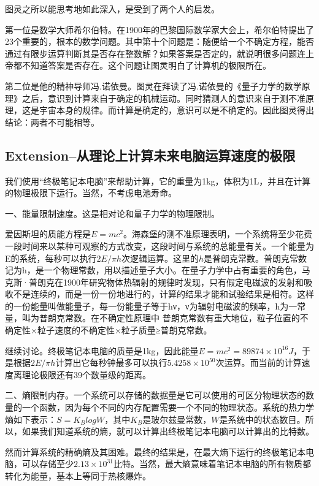 \documentclass{ctexart}
\begin{document}
	图灵之所以能思考地如此深入，是受到了两个人的启发。
	
	第一位是数学大师希尔伯特。在1900年的巴黎国际数学家大会上，希尔伯特提出了23个重要的，根本的数学问题。其中第十个问题是：随便给一个不确定方程，能否通过有限步运算判断其是否存在整数解？如果答案是否定的，就说明很多问题连上帝都不知道答案是否存在。这个问题让图灵明白了计算机的极限所在。
	
	第二位是他的精神导师冯.诺依曼。图灵在拜读了冯.诺依曼的《量子力学的数学原理》之后，意识到计算来自于确定的机械运动。同时猜测人的意识来自于测不准原理，这是宇宙本身的规律。而计算是确定的，意识可以是不确定的。因此图灵得出结论：两者不可能相等。
	\subsection{Extension--从理论上计算未来电脑运算速度的极限}
	我们使用“终极笔记本电脑”来帮助计算，它的重量为1kg，体积为1L，并且在计算的物理极限下运行。当然，不考虑电池寿命。
	
	一、能量限制速度。这是相对论和量子力学的物理限制。
	
	爱因斯坦的质能方程是$ E = mc^2 $。海森堡的测不准原理表明，一个系统将至少花费一段时间来以某种可观察的方式改变，这段时间与系统的总能量有关。一个能量为E的系统，每秒可以执行$ 2E/\pi h $次逻辑运算。这里的$ h $是普朗克常数。普朗克常数记为h，是一个物理常数，用以描述量子大小。在量子力学中占有重要的角色，马克斯·普朗克在1900年研究物体热辐射的规律时发现，只有假定电磁波的发射和吸收不是连续的，而是一份一份地进行的，计算的结果才能和试验结果是相符。这样的一份能量叫做能量子，每一份能量子等于hν，ν为辐射电磁波的频率，h为一常量，叫为普朗克常数。在不确定性原理中 普朗克常数有重大地位，粒子位置的不确定性×粒子速度的不确定性×粒子质量≥普朗克常数。
	
	继续讨论。终极笔记本电脑的质量是1kg，因此能量$ E = mc^2 = 89874 \times 10^{16} J$，于是根据$ 2E/\pi h $计算出它每秒钟最多可以执行$ 5.4258 \times 10^{50} $次运算。而当前的计算速度离理论极限还有39个数量级的距离。
	
	二、熵限制内存。一个系统可以存储的数据量是它可以使用的可区分物理状态的数量的一个函数，因为每个不同的内存配置需要一个不同的物理状态。系统的热力学熵如下表示：$ S =  K_{B}logW$，其中$ K_{B} $是玻尔兹曼常数，$ W $是系统中的状态数目。所以，如果我们知道系统的熵，就可以计算出终极笔记本电脑可以计算出的比特数。
	
	然而计算系统的精确熵及其困难。最终的结果是，在最大熵下运行的终极笔记本电脑，可以存储至少$ 2.13 \times 10^{31} $比特。当然，最大熵意味着笔记本电脑的所有物质都转化为能量，基本上等同于热核爆炸。
	
\end{document}
